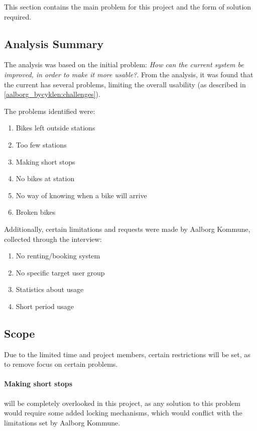This section contains the main problem for this project and the form of solution required.

\subsection{Analysis Summary}
The analysis was based on the initial problem: \textit{How can the current \citybike system be improved, in order to make it more usable?}.
From the analysis, it was found that the current \citybike has several problems, limiting the overall usability (as described in \cref{aalborg_bycyklen:challenges}).

The problems identified were:
\begin{enumerate}
\item Bikes left outside stations \label{pr_stations}
\item Too few stations \label{pr_few}
\item Making short stops \label{pr_stops}
\item No bikes at station \label{pr_nobikes}
\item No way of knowing when a bike will arrive \label{pr_arrive}
\item Broken bikes \label{pr_broken}
\end{enumerate}

Additionally, certain limitations and requests were made by Aalborg Kommune, collected through the interview:

\begin{enumerate}
\item No renting/booking system
\item No specific target user group
\item Statistics about usage
\item Short period usage
\end{enumerate}

\subsection{Scope}
Due to the limited time and project members, certain restrictions will be set, as to remove focus on certain problems.

\paragraph{Making short stops} will be completely overlooked in this project, as any solution to this problem would require some added locking mechanisms, which would conflict with the limitations set by Aalborg Kommune.

